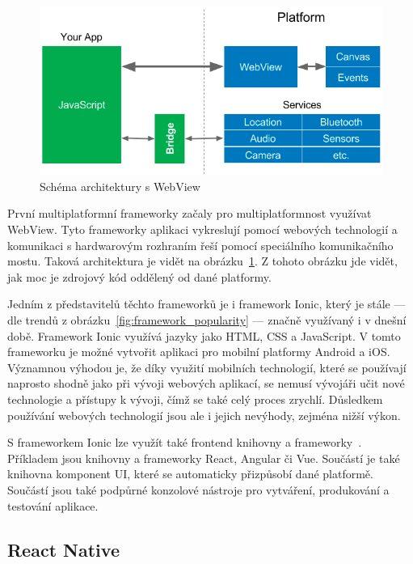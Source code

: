 \begin{figure}[ht!]
    \centering
    \includegraphics[width=\linewidth]{assets/technology-research/framework/webview.png}
    \caption{Schéma architektury s WebView
    ~\cite{hackernoon_flutter}}
    \label{fig:framework_webview}
\end{figure}

První multiplatformní frameworky začaly pro multiplatformnost využívat WebView.
\cite{hackernoon_flutter}
Tyto frameworky aplikaci vykreslují pomocí webových technologií
a komunikaci s hardwarovým rozhraním řeší pomocí speciálního komunikačního
mostu.
Taková architektura je vidět na obrázku~\ref{fig:framework_webview}.
Z tohoto obrázku jde vidět,
jak moc je zdrojový kód oddělený od dané platformy.

Jedním z představitelů těchto frameworků je i framework Ionic,
který je stále
--- dle trendů z obrázku~\ref{fig:framework_popularity} ---
značně využívaný i v dnešní době.
Framework Ionic využívá jazyky jako HTML, CSS a JavaScript.
V tomto frameworku je možné vytvořit aplikaci pro mobilní platformy
Android a iOS.
Významnou výhodou je,
že díky využití mobilních technologií,
které se používají naprosto shodně jako při vývoji webových aplikací,
se nemusí vývojáři učit nové technologie a přístupy k vývoji,
čímž se také celý proces zrychlí.
Důsledkem používání webových technologií jsou ale i jejich nevýhody,
zejména nižší výkon.~\cite{dashmagazine_mobile_frameworks}

S frameworkem Ionic lze využít také frontend knihovny a frameworky~\cite{ionic}.
Příkladem jsou knihovny a frameworky React, Angular či Vue.
Součástí je také knihovna komponent UI,
které se automaticky přizpůsobí dané platformě.
Součástí jsou také podpůrné konzolové nástroje pro vytváření, produkování a
testování aplikace.

\subsection{React Native}


